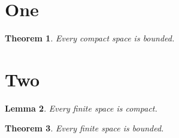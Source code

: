 \documentclass[journal]{IEEEtran}
\newtheorem{theorem}{Theorem}[section]
\newtheorem{lemma}[theorem]{Lemma}
\begin{document}
\section{One}
\begin{theorem} Every compact space is bounded. \end{theorem}
\section{Two}
\begin{lemma} Every finite space is compact. \end{lemma}
\begin{theorem} Every finite space is bounded. \end{theorem}
\end{document}

